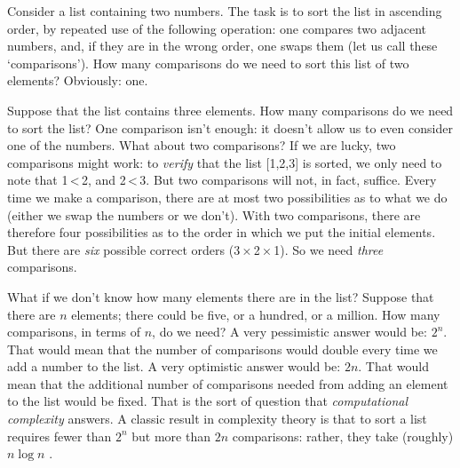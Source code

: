 Consider a list containing two numbers. The task is to sort the list in ascending order, by repeated use of the following operation: one compares two adjacent numbers, and, if they are in the wrong order, one swaps them (let us call these ‘comparisons’). How many comparisons do we need to sort this list of two elements? Obviously: one.

Suppose that the list contains three elements. How many comparisons do we need to sort the list? One comparison isn’t enough: it doesn’t allow us to even consider one of the numbers. What about two comparisons? If we are lucky, two comparisons might work: to \emph{verify} that the list [1,2,3] is sorted, we only need to note that 1 < 2, and 2 < 3. But two comparisons will not, in fact, suffice. Every time we make a comparison, there are at most two possibilities as to what we do (either we swap the numbers or we don’t). With two comparisons, there are therefore four possibilities as to the order in which we put the initial elements. But there are \emph{six} possible correct orders (3 × 2 × 1). So we need \emph{three} comparisons.

What if we don’t know how many elements there are in the list? Suppose that there are \(n\) elements; there could be five, or a hundred, or a million. How many comparisons, in terms of \(n\), do we need? A very pessimistic answer would be: \(2^n\). That would mean that the number of comparisons would double every time we add a number to the list. A very optimistic answer would be: \(2n\). That would mean that the additional number of comparisons needed from adding an element to the list would be fixed. That is the sort of question that \emph{computational complexity} answers. A classic result in complexity theory is that to sort a list requires fewer than \(2^n\) but more than \(2n\) comparisons: rather, they take (roughly) \(n \log n\) \parencite{hoare1962}.


